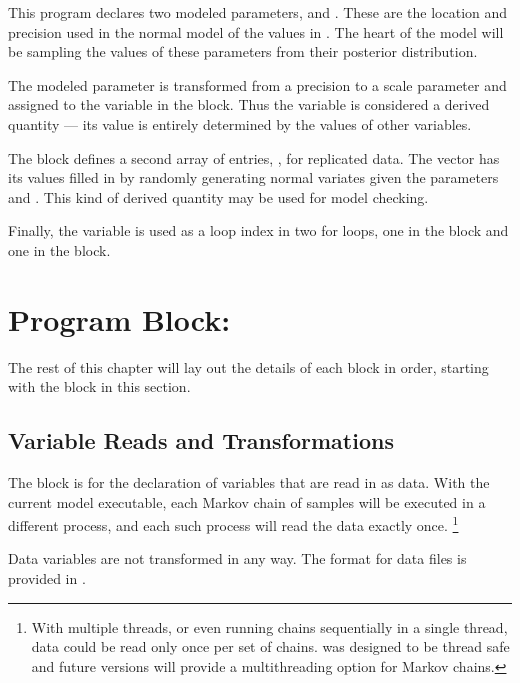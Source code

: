 This program declares two modeled parameters,  and
.  These are the location and precision used in the normal
model of the values in .  The heart of the model will be
sampling the values of these parameters from their posterior
distribution.

The modeled parameter  is transformed from a precision to
a scale parameter and assigned to the variable  in the
 block. Thus the variable 
is considered a derived quantity --- its value is entirely determined
by the values of other variables.  

The  block defines a second array of 
entries, , for replicated data.  The vector 
has its values filled in by randomly generating normal variates given
the parameters  and .  This kind of derived
quantity may be used for model checking.

Finally, the variable  is used as a loop index in two for
loops, one in the  block and one in the  block.



\section{Program Block: }

The rest of this chapter will lay out the details of each block in
order, starting with the  block in this section.

\subsection{Variable Reads and Transformations}

The  block is for the declaration of variables that are
read in as data.  With the current model executable, each Markov chain
of samples will be executed in a different process, and each such
process will read the data exactly once.%
%
\footnote{With multiple threads, or even running chains sequentially
  in a single thread, data could be read only once per set of
  chains. \Stan was designed to be thread safe and future versions 
  will provide a multithreading option for Markov chains.\label{thread.footnote}}
%

Data variables are not transformed in any way.  The format for data
files is provided in .

